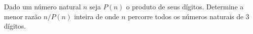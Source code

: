Dado um número natural $n$ seja $P(n)$ o produto de seus dígitos.
Determine a menor razão $n / P(n)$ inteira de onde $n$ percorre todos os números naturais de $3$ dígitos.
